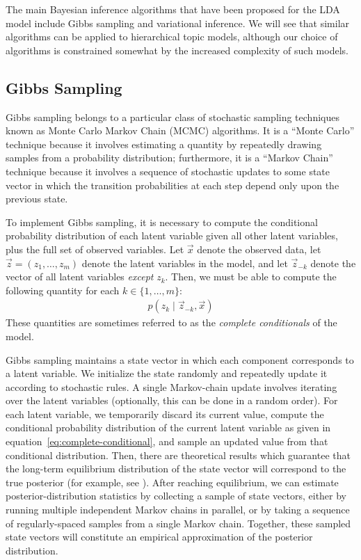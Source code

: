 \documentclass{article}
\begin{document}
The main Bayesian inference algorithms that have been proposed for the LDA model include Gibbs sampling and variational inference.
We will see that similar algorithms can be applied to hierarchical topic models, although our choice of algorithms is constrained somewhat by the increased complexity of such models.

\subsection{Gibbs Sampling}

Gibbs sampling belongs to a particular class of stochastic sampling techniques known as Monte Carlo Markov Chain (MCMC) algorithms.
It is a ``Monte Carlo'' technique because it involves estimating a quantity by repeatedly drawing samples from a probability distribution;
furthermore, it is a ``Markov Chain'' technique because it involves a sequence of stochastic updates to some state vector in which the transition probabilities at each step depend only upon the previous state.

To implement Gibbs sampling, it is necessary to compute the conditional probability distribution of each latent variable given all other latent variables, plus the full set of observed variables.
Let $\vec x$ denote the observed data, let $\vec z = (z_1, \ldots, z_m)$ denote the latent variables in the model, and let $\vec z_{-k}$ denote the vector of all latent variables \emph{except} $z_k$.
Then, we must be able to compute the following quantity for each $k \in \{1, \ldots, m\}$:
\begin{align}
p(z_k \mid \vec{z}_{-k}, \vec{x})
\label{eq:complete-conditional}
\end{align}
These quantities are sometimes referred to as the \emph{complete conditionals} of the model.

Gibbs sampling maintains a state vector in which each component corresponds to a latent variable.
We initialize the state randomly and repeatedly update it according to stochastic rules.
A single Markov-chain update involves iterating over the latent variables (optionally, this can be done in a random order).
For each latent variable, we temporarily discard its current value, compute the conditional probability distribution of the current latent variable as given in equation~\eqref{eq:complete-conditional}, and sample an updated value from that conditional distribution.
Then, there are theoretical results which guarantee that the long-term equilibrium distribution of the state vector will correspond to the true posterior (for example, see \cite{resnik2010gibbs}).
After reaching equilibrium, we can estimate posterior-distribution statistics by collecting a sample of state vectors, either by running multiple independent Markov chains in parallel, or by taking a sequence of regularly-spaced samples from a single Markov chain.
Together, these sampled state vectors will constitute an empirical approximation of the posterior distribution.
\end{document}
